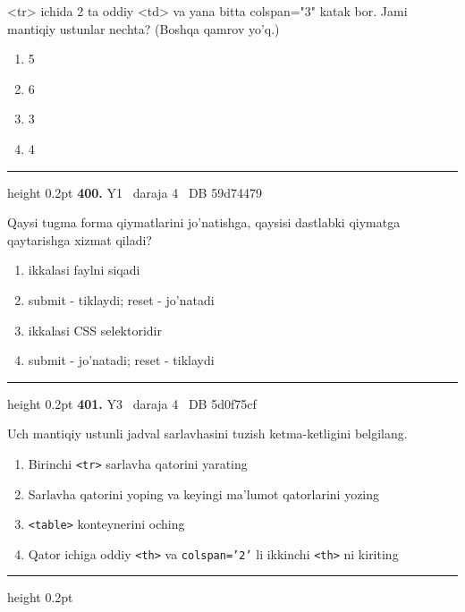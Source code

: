 \documentclass[10pt,a4paper,oneside]{article}
\begin{document}
\par
\textless{}tr\textgreater{} ichida 2 ta oddiy \textless{}td\textgreater{} va yana bitta colspan="3" katak bor. Jami mantiqiy ustunlar nechta? (Boshqa qamrov yo'q.)
\begin{enumerate}[label=\Alph*),leftmargin=9mm]
\item 5
\item 6
\item 3
\item 4
\end{enumerate}
\vspace{2mm}\hrule height 0.2pt \vspace{4mm}
\hypertarget{q400}{\textbf{\color{ink}400.}}  {\color{muted}\scriptsize Y1 \textbullet\ daraja 4 \textbullet\ DB 59d74479}
\par
Qaysi tugma forma qiymatlarini jo'natishga, qaysisi dastlabki qiymatga qaytarishga xizmat qiladi?
\begin{enumerate}[label=\Alph*),leftmargin=9mm]
\item ikkalasi faylni siqadi
\item submit - tiklaydi; reset - jo'natadi
\item ikkalasi CSS selektoridir
\item submit - jo'natadi; reset - tiklaydi
\end{enumerate}
\vspace{2mm}\hrule height 0.2pt \vspace{4mm}
\hypertarget{q401}{\textbf{\color{ink}401.}}  {\color{muted}\scriptsize Y3 \textbullet\ daraja 4 \textbullet\ DB 5d0f75cf}
\par
Uch mantiqiy ustunli jadval sarlavhasini tuzish ketma-ketligini belgilang.
\begin{enumerate}[label=\Alph*),leftmargin=9mm]
\item Birinchi \texttt{\textless{}tr\textgreater{}} sarlavha qatorini yarating
\item Sarlavha qatorini yoping va keyingi ma'lumot qatorlarini yozing
\item \texttt{\textless{}table\textgreater{}} konteynerini oching
\item Qator ichiga oddiy \texttt{\textless{}th\textgreater{}} va \texttt{colspan='2'} li ikkinchi \texttt{\textless{}th\textgreater{}} ni kiriting
\end{enumerate}
\vspace{2mm}\hrule height 0.2pt \vspace{4mm}
\end{document}
